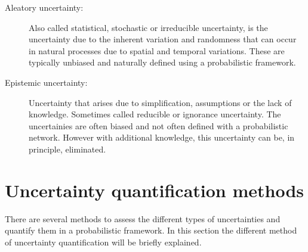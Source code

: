 \begin{description}
\item[Aleatory uncertainty:] Also called statistical, stochastic or irreducible uncertainty, is the uncertainty due to the inherent variation and randomness that can occur in natural processes due to spatial and temporal variations. These are typically unbiased and naturally defined using a probabilistic framework.
\item[Epistemic uncertainty:] Uncertainty that arises due to simplification, assumptions or the lack of knowledge. Sometimes called reducible or ignorance uncertainty. The uncertainies are often biased and not often defined with a probabilistic network. However with additional knowledge, this uncertainty can be, in principle, eliminated.
\end{description}

\section{Uncertainty quantification methods}
There are several methods to assess the different types of uncertainties and quantify them in a probabilistic framework. In this section the different method of uncertainty quantification will be briefly explained.

